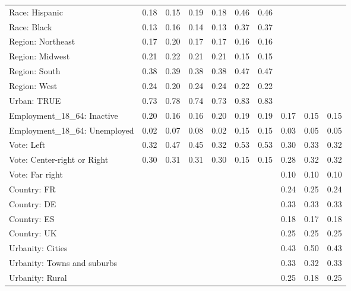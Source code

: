 \begin{tabular}[t]{llllllllll}
Race: Hispanic & 0.18 & 0.15 & 0.19 & 0.18 & 0.46 & 0.46 &  &  & \\
Race: Black & 0.13 & 0.16 & 0.14 & 0.13 & 0.37 & 0.37 &  &  & \\
\addlinespace
Region: Northeast & 0.17 & 0.20 & 0.17 & 0.17 & 0.16 & 0.16 &  &  & \\
Region: Midwest & 0.21 & 0.22 & 0.21 & 0.21 & 0.15 & 0.15 &  &  & \\
Region: South & 0.38 & 0.39 & 0.38 & 0.38 & 0.47 & 0.47 &  &  & \\
Region: West & 0.24 & 0.20 & 0.24 & 0.24 & 0.22 & 0.22 &  &  & \\
\addlinespace
Urban: TRUE & 0.73 & 0.78 & 0.74 & 0.73 & 0.83 & 0.83 &  &  & \\
\addlinespace
Employment\_18\_64: Inactive & 0.20 & 0.16 & 0.16 & 0.20 & 0.19 & 0.19 & 0.17 & 0.15 & 0.15\\
Employment\_18\_64: Unemployed & 0.02 & 0.07 & 0.08 & 0.02 & 0.15 & 0.15 & 0.03 & 0.05 & 0.05\\
\addlinespace
Vote: Left & 0.32 & 0.47 & 0.45 & 0.32 & 0.53 & 0.53 & 0.30 & 0.33 & 0.32\\
Vote: Center-right or Right & 0.30 & 0.31 & 0.31 & 0.30 & 0.15 & 0.15 & 0.28 & 0.32 & 0.32\\
Vote: Far right &  &  &  &  &  &  & 0.10 & 0.10 & 0.10\\
\addlinespace
Country: FR &  &  &  &  &  &  & 0.24 & 0.25 & 0.24\\
Country: DE &  &  &  &  &  &  & 0.33 & 0.33 & 0.33\\
Country: ES &  &  &  &  &  &  & 0.18 & 0.17 & 0.18\\
Country: UK &  &  &  &  &  &  & 0.25 & 0.25 & 0.25\\
\addlinespace
Urbanity: Cities &  &  &  &  &  &  & 0.43 & 0.50 & 0.43\\
Urbanity: Towns and suburbs &  &  &  &  &  &  & 0.33 & 0.32 & 0.33\\
Urbanity: Rural &  &  &  &  &  &  & 0.25 & 0.18 & 0.25\\
\bottomrule
\end{tabular}